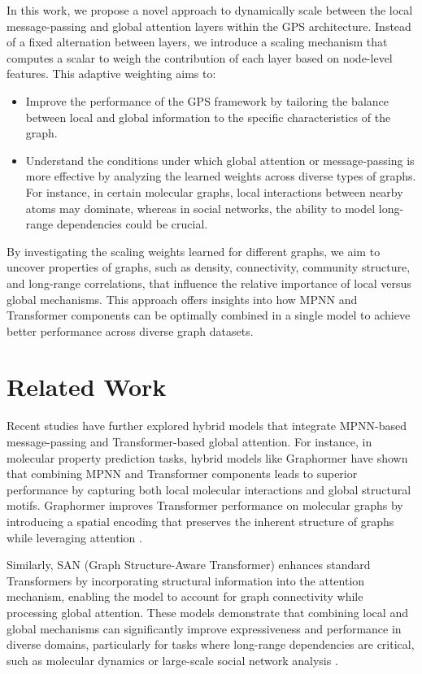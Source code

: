 \documentclass{acmart}
\begin{document}
In this work, we propose a novel approach to dynamically scale between the local message-passing and global attention layers within the GPS architecture. Instead of a fixed alternation between layers, we introduce a scaling mechanism that computes a scalar to weigh the contribution of each layer based on node-level features. This adaptive weighting aims to:

\begin{itemize}
    \item Improve the performance of the GPS framework by tailoring the balance between local and global information to the specific characteristics of the graph.
    \item Understand the conditions under which global attention or message-passing is more effective by analyzing the learned weights across diverse types of graphs. For instance, in certain molecular graphs, local interactions between nearby atoms may dominate, whereas in social networks, the ability to model long-range dependencies could be crucial.
\end{itemize}

By investigating the scaling weights learned for different graphs, we aim to uncover properties of graphs, such as density, connectivity, community structure, and long-range correlations, that influence the relative importance of local versus global mechanisms. This approach offers insights into how MPNN and Transformer components can be optimally combined in a single model to achieve better performance across diverse graph datasets.

\section{Related Work}

Recent studies have further explored hybrid models that integrate MPNN-based message-passing and Transformer-based global attention. For instance, in molecular property prediction tasks, hybrid models like Graphormer \cite{Ying2021,Shi2022} have shown that combining MPNN and Transformer components leads to superior performance by capturing both local molecular interactions and global structural motifs. Graphormer improves Transformer performance on molecular graphs by introducing a spatial encoding that preserves the inherent structure of graphs while leveraging attention \cite{Vaswani2017,Gilmer2017}.

Similarly, SAN (Graph Structure-Aware Transformer) \cite{Kreuzer2021} enhances standard Transformers by incorporating structural information into the attention mechanism, enabling the model to account for graph connectivity while processing global attention. These models demonstrate that combining local and global mechanisms can significantly improve expressiveness and performance in diverse domains, particularly for tasks where long-range dependencies are critical, such as molecular dynamics or large-scale social network analysis \cite{Bacciu2020}.
\end{document}
